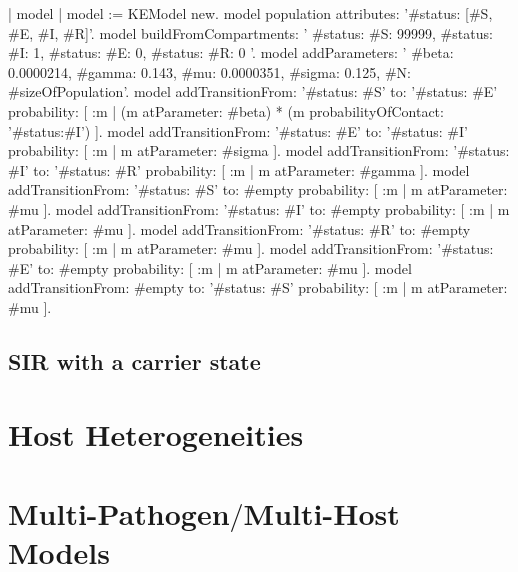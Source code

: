 \documentclass[a4paper,10pt,twoside]{book}
\begin{document}
\begin{code}{}
  | model |
	model := KEModel new.
  model population attributes: '{#status: [#S, #E, #I, #R]}'.
	model
		buildFromCompartments:
			'{
		{#status: #S}: 99999,
		{#status: #I}: 1,
		{#status: #E}: 0,
		{#status: #R}: 0
	}'.
	model addParameters: '{
    #beta: 0.0000214,
    #gamma: 0.143,
    #mu: 0.0000351,
    #sigma: 0.125,
    #N: #sizeOfPopulation}'.
	model
		addTransitionFrom: '{#status: #S}'
		to: '{#status: #E}'
		probability: [ :m | (m atParameter: #beta) * (m probabilityOfContact: '{#status:#I}') ].
	model
    addTransitionFrom: '{#status: #E}'
    to: '{#status: #I}'
    probability: [ :m | m atParameter: #sigma ].
	model
    addTransitionFrom: '{#status: #I}'
    to: '{#status: #R}'
    probability: [ :m | m atParameter: #gamma ].
	model
    addTransitionFrom: '{#status: #S}'
    to: #empty
    probability: [ :m | m atParameter: #mu ].
	model
    addTransitionFrom: '{#status: #I}'
    to: #empty
    probability: [ :m | m atParameter: #mu ].
	model
    addTransitionFrom: '{#status: #R}'
    to: #empty
    probability: [ :m | m atParameter: #mu ].
	model
    addTransitionFrom: '{#status: #E}'
    to: #empty
    probability: [ :m | m atParameter: #mu ].
	model
    addTransitionFrom: #empty
    to: '{#status: #S}'
    probability: [ :m | m atParameter: #mu ].
\end{code}

\section{ SIR with a carrier state}\chapter{ Host Heterogeneities}\chapter{ Multi-Pathogen$/$Multi-Host Models}




\printindex
\end{document}
